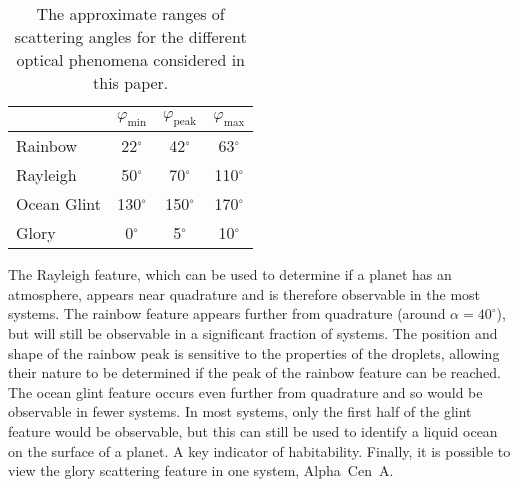 \documentclass[
    usenatbib,
]{mnras}
\begin{document}
\begin{table}
    \centering
    \caption{
        The approximate ranges of scattering angles for the different optical phenomena considered in this paper.
    }
    \label{tab:phase_ranges}
    \begin{tabular}{ l c c c } 
        \toprule
        & $\varphi_\mathrm{min}$ & $\varphi_\mathrm{peak}$ & $\varphi_\mathrm{max}$ \\
        \midrule
        \midrule
        Rainbow    & 22$^\circ$    & 42$^\circ$    & 63$^\circ$ \\
        Rayleigh    & 50$^\circ$    & 70$^\circ$    & 110$^\circ$ \\
        Ocean Glint & 130$^\circ$   & 150$^\circ$   & 170$^\circ$ \\
        Glory       & 0$^\circ$     & 5$^\circ$     & 10$^\circ$ \\
        \bottomrule
    \end{tabular}
\end{table}

The Rayleigh feature, which can be used to determine if a planet has an atmosphere, appears near quadrature and is therefore observable in the most systems.
%
The rainbow feature appears further from quadrature (around $\alpha=40^\circ$), but will still be observable in a significant fraction of systems.
%
The position and shape of the rainbow peak is sensitive to the properties of the droplets, allowing their nature to be determined if the peak of the rainbow feature can be reached.
%
The ocean glint feature occurs even further from quadrature and so would be observable in fewer systems. 
%
In most systems, only the first half of the glint feature would be observable, but this can still be used to identify a liquid ocean on the surface of a planet.
%
A key indicator of habitability. 
Finally, it is possible to view the glory scattering feature in one system, Alpha~Cen~A.
\end{document}
